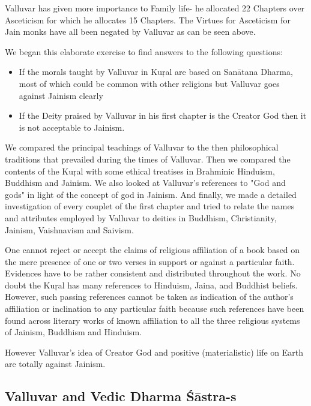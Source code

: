 Valluvar has given more importance to Family life- he allocated 22 Chapters over Asceticism for which he allocates 15 Chapters. The Virtues for Asceticism for Jain monks have all been negated by Valluvar as can be seen above.

We began this elaborate exercise to find answers to the following questions:

\begin{itemize}
\item If the morals taught by Valluvar in Kuŗal are based on Sanātana Dharma, most of which could be common with other religions but Valluvar goes against Jainism clearly

 \item If the Deity praised by Valluvar in his first chapter is the Creator God then it is not acceptable to Jainism.

\end{itemize}

We compared the principal teachings of Valluvar to the then philosophical traditions that prevailed during the times of Valluvar. Then we compared the contents of the Kuŗal with some ethical treatises in Brahminic Hinduism, Buddhism and Jainism. We also looked at Valluvar's references to "God and gods" in light of the concept of god in Jainism. And finally, we made a detailed investigation of every couplet of the first chapter and tried to relate the names and attributes employed by Valluvar to deities in Buddhism, Christianity, Jainism, Vaishnavism and Saivism.

One cannot reject or accept the claims of religious affiliation of a book based on the mere presence of one or two verses in support or against a particular faith. Evidences have to be rather consistent and distributed throughout the work. No doubt the Kuŗal has many references to Hinduism, Jaina, and Buddhist beliefs. However, such passing references cannot be taken as indication of the author's affiliation or inclination to any particular faith because such references have been found across literary works of known affiliation to all the three religious systems of Jainism, Buddhism and Hinduism.

However Valluvar’s idea of Creator God and positive (materialistic) life on Earth are totally against Jainism.

\subsection*{Valluvar and Vedic Dharma Śāstra-s}

